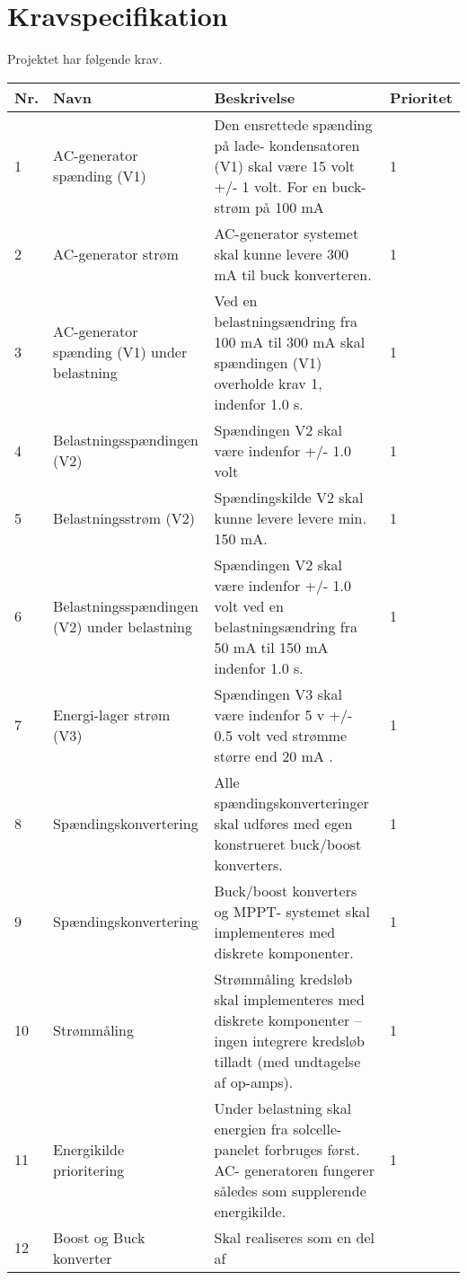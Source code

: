 \documentclass[../main.tex]{subfiles}
\begin{document}
\section{Kravspecifikation}\label{Sec:Kravspecifikation}
Projektet har følgende krav.
\renewcommand{\arraystretch}{1.2}
    \begin{longtable}{|l|p{}|p{}|l|}
 \hline
 \rowcolors{HTML}{c0c0c0c0}\textbf{Nr.} & \textbf{Navn} & \textbf{Beskrivelse} &\textbf{Prioritet}\\
 \hline
  1  & AC-generator spænding (V1) & Den ensrettede spænding på lade-
kondensatoren (V1) skal være 15
volt +/- 1 volt. For en buck-strøm på
100 mA & 1 \\
 \hline
 2  & AC-generator strøm  & AC-generator systemet skal kunne
levere 300 mA til buck konverteren. & 1 \\
 \hline
 3  & AC-generator spænding (V1) under
belastning  & Ved en belastningsændring fra 100
mA til 300 mA skal spændingen (V1)
overholde krav 1, indenfor 1.0 s. & 1 \\
 \hline
 4  & Belastningsspændingen (V2)   & Spændingen V2 skal være indenfor
+/- 1.0 volt & 1 \\
 \hline
 5  & Belastningsstrøm (V2)   & Spændingskilde V2 skal kunne levere
levere min. 150 mA. & 1 \\
 \hline
 6  & Belastningsspændingen (V2) under
belastning  & Spændingen V2 skal være indenfor
+/- 1.0 volt ved en
belastningsændring fra 50 mA til 150
mA indenfor 1.0 s. & 1 \\
 \hline
 7  & Energi-lager strøm (V3)  & Spændingen V3 skal være indenfor 5
v +/- 0.5 volt ved strømme større
end 20 mA . & 1 \\
 \hline
 8  & Spændingskonvertering   & Alle spændingskonverteringer skal
udføres med egen konstrueret
buck/boost konverters. & 1 \\
 \hline
 9  & Spændingskonvertering   & Buck/boost konverters og MPPT-
systemet skal implementeres med
diskrete komponenter. & 1 \\
 \hline
 10  & Strømmåling   & Strømmåling kredsløb skal
implementeres med diskrete
komponenter – ingen integrere
kredsløb tilladt (med undtagelse af
op-amps). & 1 \\
 \hline
 11  & Energikilde prioritering  & Under belastning skal energien fra
solcelle-panelet forbruges først. AC-
generatoren fungerer således som
supplerende energikilde. & 1 \\
 \hline
 12  & Boost og Buck konverter   & Skal realiseres som en del af

\end{longtable}
\end{document}

